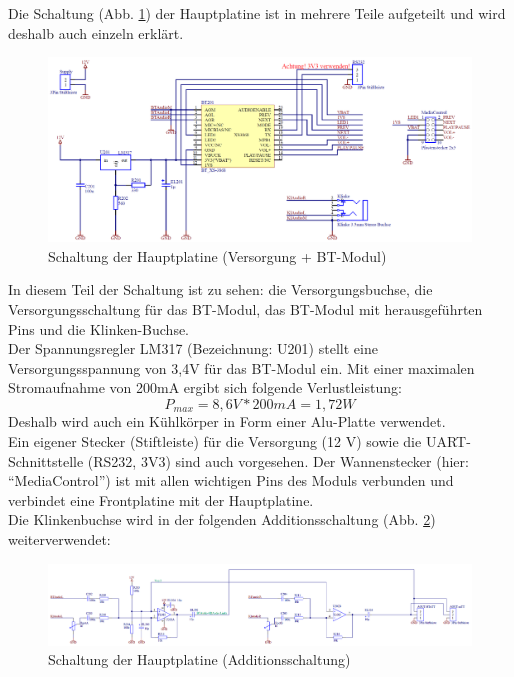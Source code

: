 Die Schaltung (Abb. \ref{fig:5.3.8.2.1}) der Hauptplatine ist in mehrere Teile aufgeteilt und wird deshalb auch einzeln erklärt.
\begin{figure} [H]
	\centering
	\includegraphics[width=1\textwidth]{img/BTModul/hauptboard_sch1.png}
	\caption{Schaltung der Hauptplatine (Versorgung + BT-Modul)}\label {fig:5.3.8.2.1}
\end{figure} 
In diesem Teil der Schaltung ist zu sehen: die Versorgungsbuchse, die Versorgungsschaltung für das BT-Modul, das BT-Modul mit herausgeführten Pins und die Klinken-Buchse.
\\
Der Spannungsregler LM317 (Bezeichnung: U201) stellt eine Versorgungsspannung von 3,4V für das BT-Modul ein. 
Mit einer maximalen Stromaufnahme von 200mA ergibt sich folgende Verlustleistung:
\begin{equation}
	P_{max} = 8,6 V * 200 mA = 1,7 2W
\end{equation}
Deshalb wird auch ein Kühlkörper in Form einer Alu-Platte verwendet.
\\
Ein eigener Stecker (Stiftleiste) für die Versorgung (12 V) sowie die UART-Schnittstelle (RS232, 3V3) sind auch vorgesehen.
Der Wannenstecker (hier: \enquote{MediaControl}) ist mit allen wichtigen Pins des Moduls verbunden und verbindet eine Frontplatine mit der Hauptplatine.
\\
Die Klinkenbuchse wird in der folgenden Additionsschaltung (Abb. \ref {fig:5.3.8.2.2}) weiterverwendet:
\begin{figure} [H]
	\centering
	\includegraphics[width=1\textwidth]{img/BTModul/hauptboard_sch2.png}
	\caption{Schaltung der Hauptplatine (Additionsschaltung)}\label {fig:5.3.8.2.2}
\end{figure}
